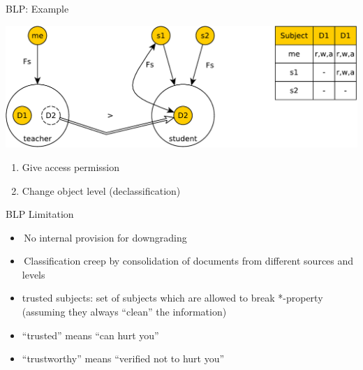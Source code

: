 \documentclass{beamer}
\begin{document}
\begin{frame}[t]{BLP: Example}
  \begin{center}
    \includegraphics[width=0.8\linewidth]{ex12}
  \end{center}
\begin{enumerate}
  \item Give access permission
  \item Change object level (declassification)
\end{enumerate}
\end{frame}

\begin{frame}{BLP Limitation}
  \begin{itemize}
    \item No internal provision for downgrading
    \item Classification creep by consolidation of 
      documents from different sources and levels
    \item \alert{trusted subjects}: set of subjects which are 
      allowed to break *-property (assuming they always 
      ``clean'' the information)
    \item ``trusted''  means ``can hurt you''
    \item ``trustworthy'' means ``verified not to hurt you''
  \end{itemize}
\end{frame}
\end{document}
